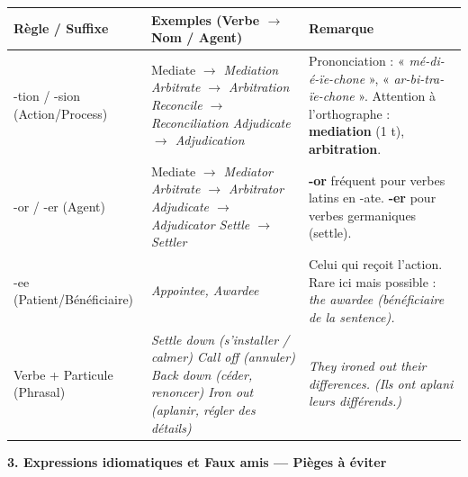 \documentclass[11pt]{article}
\newcommand{\cle}[1]{{\popxbold\color{popdark}#1}}
\newcommand{\eng}[1]{\ifmmode\text{\textit{#1}}\else\begingroup\selectlanguage{english}\itshape #1\endgroup\fi}
\begin{document}
\begin{bilan}
\begin{center}
\begin{tabularx}{\linewidth}{|X|X|X|}
\hline
\rowcolor{popblueL}
\textbf{Règle / Suffixe} & \textbf{Exemples (Verbe $\to$ Nom / Agent)} & \textbf{Remarque} \\
\hline
\cle{-tion / -sion} (Action/Process) & Mediate $\to$ \eng{Mediation} \newline Arbitrate $\to$ \eng{Arbitration} \newline Reconcile $\to$ \eng{Reconciliation} \newline Adjudicate $\to$ \eng{Adjudication} & Prononciation : « \emph{mé-di-é-ïe-chone} », « \emph{ar-bi-tra-ïe-chone} ». Attention à l'orthographe : \textbf{mediation} (1 t), \textbf{arbitration}. \\
\cle{-or / -er} (Agent) & Mediate $\to$ \eng{Mediator} \newline Arbitrate $\to$ \eng{Arbitrator} \newline Adjudicate $\to$ \eng{Adjudicator} \newline Settle $\to$ \eng{Settler} & \textbf{-or} fréquent pour verbes latins en -ate. \textbf{-er} pour verbes germaniques (settle). \\
\cle{-ee} (Patient/Bénéficiaire) & \eng{Appointee}, \eng{Awardee} & Celui qui reçoit l'action. Rare ici mais possible : \eng{the awardee} (bénéficiaire de la sentence). \\
\cle{Verbe + Particule (Phrasal)} & \eng{Settle down} (s'installer / calmer) \newline \eng{Call off} (annuler) \newline \eng{Back down} (céder, renoncer) \newline \eng{Iron out} (aplanir, régler des détails) & \eng{They ironed out their differences.} (Ils ont aplani leurs différends.) \\
\hline
\end{tabularx}
\end{center}

\textbf{3. Expressions idiomatiques et Faux amis — Pièges à éviter}


\end{bilan}
\end{document}
